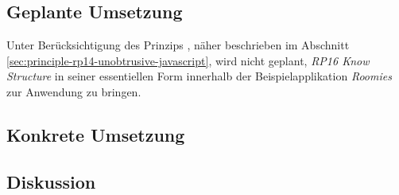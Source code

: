 \subsection*{Geplante Umsetzung}

Unter Berücksichtigung des Prinzips \emph{}, näher beschrieben im Abschnitt \ref{sec:principle-rp14-unobtrusive-javascript}, wird nicht geplant, \emph{RP16 Know Structure} in seiner essentiellen Form innerhalb der Beispielapplikation \emph{Roomies} zur Anwendung zu bringen.


\subsection*{Konkrete Umsetzung}



\subsection*{Diskussion}
